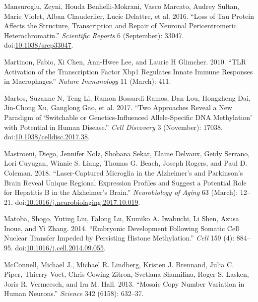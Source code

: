 \documentclass[onehalf,12pt]{beavtex}
\begin{document}
  \hypertarget{ref-MansurogluLossTauprotein2016}{}
  Mansuroglu, Zeyni, Houda Benhelli-Mokrani, Vasco Marcato, Audrey Sultan,
  Marie Violet, Alban Chauderlier, Lucie Delattre, et al. 2016. ``Loss of
  Tau Protein Affects the Structure, Transcription and Repair of Neuronal
  Pericentromeric Heterochromatin.'' \emph{Scientific Reports} 6
  (September): 33047.
  doi:\href{https://doi.org/10.1038/srep33047}{10.1038/srep33047}.
  
  \hypertarget{ref-MartinonTLRactivationtranscription2010}{}
  Martinon, Fabio, Xi Chen, Ann-Hwee Lee, and Laurie H Glimcher. 2010.
  ``TLR Activation of the Transcription Factor Xbp1 Regulates Innate
  Immune Responses in Macrophages.'' \emph{Nature Immunology} 11 (March):
  411.
  
  \hypertarget{ref-MartosTwoapproachesreveal2017}{}
  Martos, Suzanne N, Teng Li, Ramon Bossardi Ramos, Dan Lou, Hongzheng
  Dai, Jin-Chong Xu, Ganglong Gao, et al. 2017. ``Two Approaches Reveal a
  New Paradigm of `Switchable or Genetics-Influenced Allele-Specific DNA
  Methylation' with Potential in Human Disease.'' \emph{Cell Discovery} 3
  (November): 17038.
  doi:\href{https://doi.org/10.1038/celldisc.2017.38}{10.1038/celldisc.2017.38}.
  
  \hypertarget{ref-MastroeniLasercapturedmicrogliaAlzheimer2018}{}
  Mastroeni, Diego, Jennifer Nolz, Shobana Sekar, Elaine Delvaux, Geidy
  Serrano, Lori Cuyugan, Winnie S. Liang, Thomas G. Beach, Joseph Rogers,
  and Paul D. Coleman. 2018. ``Laser-Captured Microglia in the Alzheimer's
  and Parkinson's Brain Reveal Unique Regional Expression Profiles and
  Suggest a Potential Role for Hepatitis B in the Alzheimer's Brain.''
  \emph{Neurobiology of Aging} 63 (March): 12--21.
  doi:\href{https://doi.org/10.1016/j.neurobiolaging.2017.10.019}{10.1016/j.neurobiolaging.2017.10.019}.
  
  \hypertarget{ref-MatobaEmbryonicDevelopmentfollowing2014}{}
  Matoba, Shogo, Yuting Liu, Falong Lu, Kumiko A. Iwabuchi, Li Shen, Azusa
  Inoue, and Yi Zhang. 2014. ``Embryonic Development Following Somatic
  Cell Nuclear Transfer Impeded by Persisting Histone Methylation.''
  \emph{Cell} 159 (4): 884--95.
  doi:\href{https://doi.org/10.1016/j.cell.2014.09.055}{10.1016/j.cell.2014.09.055}.
  
  \hypertarget{ref-McConnellMosaiccopynumber2013}{}
  McConnell, Michael J., Michael R. Lindberg, Kristen J. Brennand, Julia
  C. Piper, Thierry Voet, Chris Cowing-Zitron, Svetlana Shumilina, Roger
  S. Lasken, Joris R. Vermeesch, and Ira M. Hall. 2013. ``Mosaic Copy
  Number Variation in Human Neurons.'' \emph{Science} 342 (6158): 632--37.
  
\end{document}
